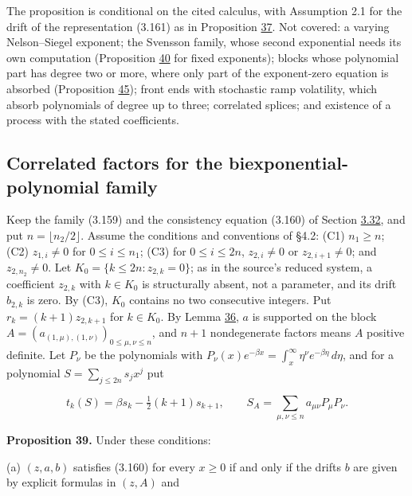 \documentclass[11pt]{article}
\begin{document}
The proposition is conditional on the cited calculus, with Assumption 2.1 for the drift of the representation (3.161) as in Proposition \hyperref[res:Proposition-37]{37}. Not covered: a varying Nelson--Siegel exponent; the Svensson family, whose second exponential needs its own computation (Proposition \hyperref[res:Proposition-40]{40} for fixed exponents); blocks whose polynomial part has degree two or more, where only part of the exponent-zero equation is absorbed (Proposition \hyperref[res:Proposition-45]{45}); front ends with stochastic ramp volatility, which absorb polynomials of degree up to three; correlated splices; and existence of a process with the stated coefficients.

\subsection{Correlated factors for the biexponential-polynomial family}\label{sec:3.34}

Keep the family (3.159) and the consistency equation (3.160) of Section \hyperref[sec:3.32]{3.32}, and put \(n=\lfloor n_2/2\rfloor\). Assume the conditions and conventions of \cite{sharef2004conditions} §4.2: (C1) \(n_1\ge n\); (C2) \(z_{1,i}\neq0\) for \(0\le i\le n_1\); (C3) for \(0\le i\le2n\), \(z_{2,i}\neq0\) or \(z_{2,i+1}\neq0\); and \(z_{2,n_2}\neq0\). Let \(K_0=\{k\le2n:z_{2,k}=0\}\); as in the source's reduced system, a coefficient \(z_{2,k}\) with \(k\in K_0\) is structurally absent, not a parameter, and its drift \(b_{2,k}\) is zero. By (C3), \(K_0\) contains no two consecutive integers. Put \(r_k=(k+1)z_{2,k+1}\) for \(k\in K_0\). By Lemma \hyperref[res:Lemma-36]{36}, \(a\) is supported on the block \(A=(a_{(1,\mu),(1,\nu)})_{0\le\mu,\nu\le n}\), and \(n+1\) nondegenerate factors means \(A\) positive definite. Let \(P_\nu\) be the polynomials with \(P_\nu(x)e^{-\beta x}=\int_x^\infty\eta^\nu e^{-\beta\eta}\,d\eta\), and for a polynomial \(S=\sum_{j\le2n}s_jx^j\) put

\begin{equation*}
t_k(S)=\beta s_k-\tfrac12(k+1)s_{k+1},\qquad S_A=\sum_{\mu,\nu\le n}a_{\mu\nu}P_\mu P_\nu. \tag{3.164}\label{eq:3.164}
\end{equation*}

\label{res:Proposition-39}
\textbf{Proposition 39.} Under these conditions:

(a) \((z,a,b)\) satisfies (3.160) for every \(x\ge0\) if and only if the drifts \(b\) are given by explicit formulas in \((z,A)\) and
\end{document}
